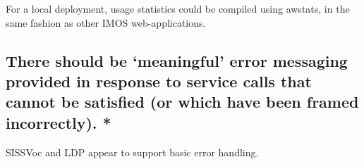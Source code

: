 \documentclass[10pt,a4paper]{article}
\begin{document}
\begin{flushleft}
  \item For a local deployment, usage statistics could be compiled using awstats, in the same fashion as other 
  IMOS web-applications. 



\subsection{ 
There should be ‘meaningful’ error messaging provided in response to
service calls that cannot be satisfied (or which have been framed incorrectly).
* }

  \item SISSVoc and LDP appear to support basic error handling.




  \end{flushleft}
\end{document}
